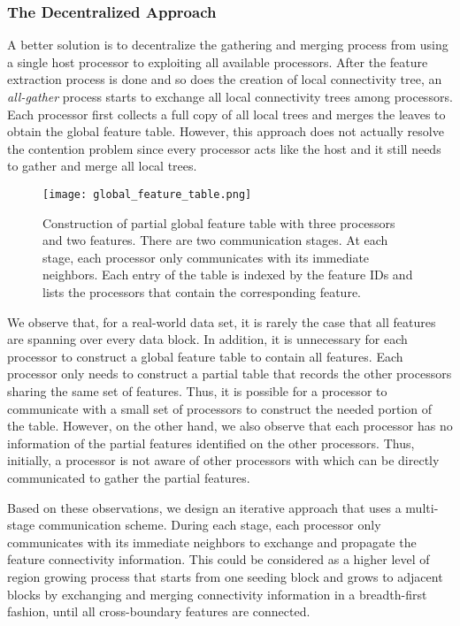 \subsubsection{The Decentralized Approach}
\label{sec:decentralized}

A better solution is to decentralize the gathering and merging process from using a single host processor to exploiting all available processors. After the feature extraction process is done and so does the creation of local connectivity tree, an \emph{all-gather} process starts to exchange all local connectivity trees among processors. Each processor first collects a full copy of all local trees and merges the leaves to obtain the global feature table. However, this approach does not actually resolve the contention problem since every processor acts like the host and it still needs to gather and merge all local trees. 

\begin{figure}[t]
	\centering
	\texttt{[image: global\_feature\_table.png]}
	\caption{Construction of partial global feature table with three processors and two features. There are two communication stages. At each stage, each processor only communicates with its immediate neighbors. Each entry of the table is indexed by the feature IDs and lists the processors that contain the corresponding feature.}
	\label{fig:global_table}
\end{figure}

We observe that, for a real-world data set, it is rarely the case that all features are spanning over every data block. In addition, it is unnecessary for each processor to construct a global feature table to contain all features. Each processor only needs to construct a partial table that records the other processors sharing the same set of features. Thus, it is possible for a processor to communicate with a small set of processors to construct the needed portion of the table. However, on the other hand, we also observe that each processor has no information of the partial features identified on the other processors. Thus, initially, a processor is not aware of other processors with which can be directly communicated to gather the partial features. 

Based on these observations, we design an iterative approach that uses a multi-stage communication scheme. During each stage, each processor only communicates with its immediate neighbors to exchange and propagate the feature connectivity information. This could be considered as a higher level of region growing process that starts from one seeding block and grows to adjacent blocks by exchanging and merging connectivity information in a breadth-first fashion, until all cross-boundary features are connected. 

